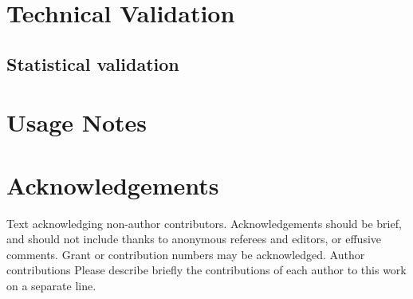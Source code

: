 \documentclass[english]{article}
\begin{document}
\section*{Technical Validation}


\subsection{Statistical validation}



\section*{Usage Notes}




\section*{Acknowledgements}

Text acknowledging non-author contributors. Acknowledgements should
be brief, and should not include thanks to anonymous referees and
editors, or effusive comments. Grant or contribution numbers may be
acknowledged. Author contributions Please describe briefly the contributions
of each author to this work on a separate line. 
\end{document}

